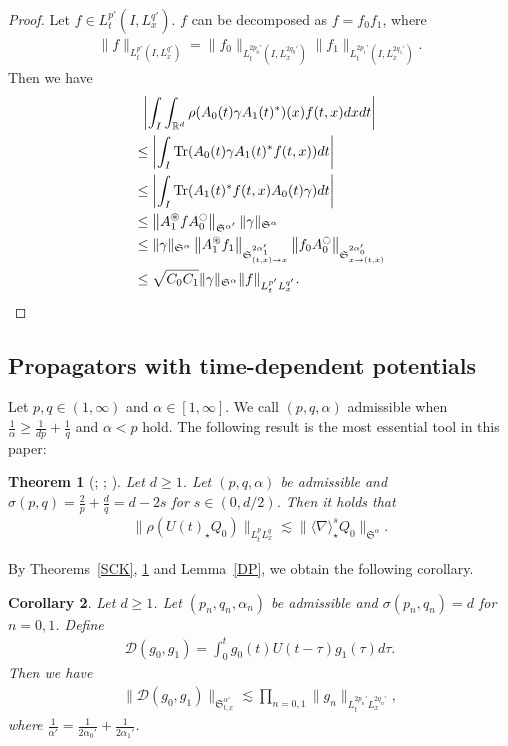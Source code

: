 \documentclass[10pt]{amsart}
\newcommand{\No}[1]{}
\newtheorem{theo}{Theorem}[section]
\newtheorem{coro}[theo]{Corollary}
\theoremstyle{definition}
\numberwithin{equation}{section}
\newcommand{\oast}{\circledast}
\newcommand{\CD}{\mathcal{D}}
\newcommand{\FS}{\mathfrak{S}}
\newcommand{\al}{\alpha}
\newcommand{\ga}{\gamma}
\newcommand{\ta}{\tau}
\newcommand{\si}{\sigma}
\newcommand{\rh}{\rho}
\newcommand{\abs}[1]{\left|#1\right|}
\renewcommand{\No}[1]{\left\| #1 \right\|}
\newcommand{\I}{\infty}
\DeclareMathOperator{\Tr}{Tr}
\newcommand{\sd}{\langle \nabla \rangle}
\newcommand{\Sa}{{\FS^\al}}
\newcommand{\st}{\star}
\newcommand{\R}{\mathbb{R}}
\newcommand{\oc}{\ocircle}
\newcommand{\os}{\oast}
\newcommand{\ls}{\lesssim}
\begin{document}
\begin{proof}
Let $f \in L^{p'}_t(I,L^{q'}_x)$. $f$ can be decomposed as $f = f_0 f_1$, where
\begin{align}
\|f\|_{L^{p'}_t\left(I,L^{q'}_x\right)} = \|f_0\|_{L^{2p_0'}_t\left(I,L^{2q_0'}_x\right)} \|f_1\|_{L^{2p_1'}_t\left(I,L^{2q_1'}_x\right)}.
\end{align}
Then we have
\begin{multline}
\abs{\int_I \int_{\R^d} \rh(A_0(t)\ga A_1(t)^*)(x) f(t,x) dx dt}\\
\begin{aligned}
 &\leq \abs{\int_I \Tr (A_0(t) \ga A_1(t)^* f(t,x)) dt } \\
&\leq \abs{\int_I \Tr (A_1(t)^* f(t,x)A_0(t) \ga) dt} \\
&\leq \No{A_1^\os f A_0^\oc }_{\FS^{\al'}} \|\ga\|_{\FS^\al} \\
&\leq \|\ga\|_{\Sa} \left\|A_1^\os f_1\right\|_{\FS^{2\al_1'}_{(t,x) \to x}} \left\|f_0 A_0^\oc\right\|_{\FS^{2\al_0'}_{x\to(t,x)}}\\
&\leq \sqrt{C_0C_1}\|\ga\|_\Sa \|f\|_{L^{p'}_tL^{q'}_x}.\qedhere
\end{aligned}
\end{multline}
\end{proof}
\setcounter{theo}{5}
\setcounter{equation}{45}
\subsection{Propagators with time-dependent potentials} 

Let $p,q \in (1,\I)$ and $\al \in [1,\I]$. We call $(p,q,\al)$ admissible when $\frac{1}{\al} \ge \frac{1}{dp} + \frac{1}{q}$ and $\al < p$ hold. The following result is the most essential tool in this paper:

\begin{theo}[{\cite[Theorem~1]{2014FLLS}; \cite[Theorem~8]{2017FS}; \cite[Theorem~1.5]{2019BHLNS}}] \label{Ostri}
Let $d \ge 1$. Let $(p,q,\al)$ be admissible and $\si(p,q)=\frac{2}{p}+\frac{d}{q}=d-2s$ for $s \in (0,d/2)$. Then it holds that
\begin{align}
\|\rh(U(t)_\st Q_0)\|_{L^p_t L^q_x} \ls \|\sd^s_\st Q_0\|_{\FS^\al}.
\end{align}
\end{theo}


By Theorems~\ref{SCK}, \ref{Ostri} and Lemma~\ref{DP}, we obtain the following corollary.

\begin{coro}\label{DS}
Let $d \geq 1$. Let $(p_n,q_n,\al_n)$ be admissible and $\si(p_n,q_n)=d$ for $n = 0,1$. Define
\begin{align}
\CD(g_0,g_1) = \int_0^t g_0(t)U(t-\ta)g_1(\ta)d\ta.
\end{align}
Then we have
\begin{align}
\|\CD(g_0,g_1)\|_{\FS^{\al'}_{t,x}} \ls \prod_{n=0,1} \|g_n\|_{L^{2p_n'}_t L^{2q_n'}_x},
\end{align}
where $\frac{1}{\al'} = \frac{1}{2\al_0'} + \frac{1}{2\al_1'}$.
\end{coro}
\end{document}
